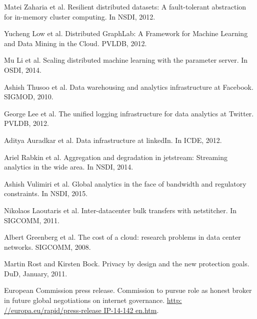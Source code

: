 \documentclass[10pt,conference,letterpaper]{IEEEtran}
\begin{document}
\newpage

%
%
%
\begin{thebibliography}{1}

Matei Zaharia et al. Resilient distributed datasets: A fault-tolerant abstraction for in-memory cluster computing. In NSDI, 2012.


Yucheng Low et al. Distributed GraphLab: A Framework for Machine Learning and Data Mining in the Cloud. PVLDB, 2012.

Mu Li et al. Scaling distributed machine learning with the parameter server. In OSDI, 2014.

Ashish Thusoo et al. Data warehousing and analytics infrastructure at Facebook. SIGMOD, 2010.

George Lee et al. The unified logging infrastructure for data analytics at Twitter. PVLDB, 2012.

Aditya Auradkar et al. Data infrastructure at linkedIn. In ICDE, 2012.

Ariel Rabkin et al. Aggregation and degradation in jetstream: Streaming analytics in the wide area. In NSDI, 2014.

Ashish Vulimiri et al. Global analytics in the face of bandwidth and regulatory constraints. In NSDI, 2015.

Nikolaos Laoutaris et al. Inter-datacenter bulk transfers with netstitcher. In SIGCOMM, 2011.

Albert Greenberg et al. The cost of a cloud: research problems in data center networks. SIGCOMM, 2008.

Martin Rost and Kirsten Bock. Privacy by design and the new protection goals. DuD, January, 2011.

European Commission press release. Commission to pursue role as honest broker in future global negotiations on internet governance. \url{http: //europa.eu/rapid/press-release IP-14-142 en.htm}.


\end{thebibliography}
\end{document}
